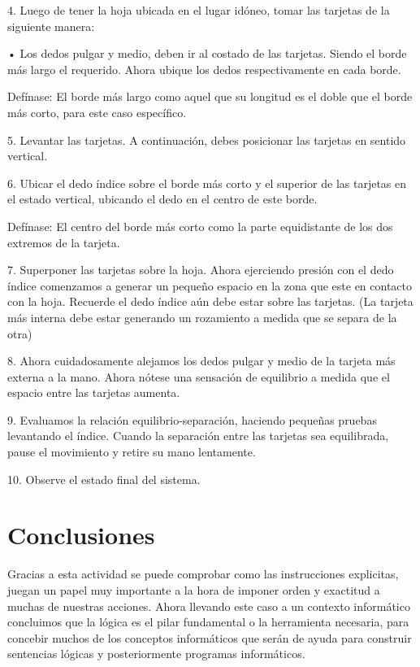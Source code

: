 \documentclass{article}
\begin{document}
4. Luego de tener la hoja ubicada en el lugar idóneo, tomar las tarjetas de la siguiente manera:

    •	Los dedos pulgar y medio, deben ir al costado de las tarjetas. Siendo el borde más largo el requerido. Ahora ubique los dedos respectivamente en cada borde.  

    Defínase: El borde más largo como aquel que su longitud es el doble que el borde más corto, para este caso específico.  

5. Levantar las tarjetas. A continuación, debes posicionar las tarjetas en sentido vertical.  

6. Ubicar el dedo índice sobre el borde más corto y el superior de las tarjetas en el estado vertical, ubicando el dedo en el centro de este borde. 

    Defínase: El centro del borde más corto como la parte equidistante de los dos extremos de la tarjeta.   

7.  Superponer las tarjetas sobre la hoja. Ahora ejerciendo presión con el dedo índice comenzamos a generar un pequeño espacio en la zona que este en contacto con la hoja. Recuerde el dedo índice aún debe estar sobre las tarjetas. 
    (La tarjeta más interna debe estar generando un rozamiento a medida que se separa de la otra)

8. Ahora cuidadosamente alejamos los dedos pulgar y medio de la tarjeta más externa a la mano. Ahora nótese una sensación de equilibrio a medida que el espacio entre las tarjetas aumenta. 

9. Evaluamos la relación equilibrio-separación, haciendo pequeñas pruebas levantando el índice. Cuando la separación entre las tarjetas sea equilibrada, pause el movimiento y retire su mano lentamente. 

10. Observe el estado final del sistema.  

\section{Conclusiones} 
Gracias a esta actividad se puede comprobar como las instrucciones explicitas, juegan un papel muy importante a la hora de imponer orden y exactitud a muchas de nuestras acciones. Ahora llevando este caso a un contexto informático concluimos que la lógica es el pilar fundamental o la herramienta necesaria, para concebir muchos de los conceptos informáticos que serán de ayuda para construir sentencias lógicas y posteriormente programas informáticos.
\end{document}
